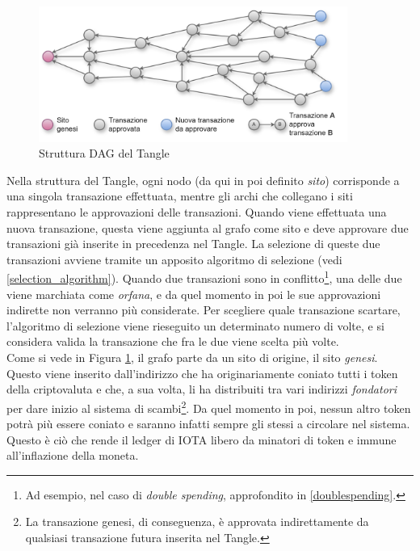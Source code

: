 \documentclass[12pt,a4paper,openright,twoside]{report}
\begin{document}
\begin{figure}[h]
\begin{center}
\includegraphics[width=0.9\textwidth]{figures/my_tangle.png}
\caption[Il Tangle]{Struttura DAG del Tangle}\label{fig:tangle}
\end{center}
\end{figure}
Nella struttura del Tangle, ogni nodo (da qui in poi definito \textit{sito}) corrisponde a una singola transazione effettuata, mentre gli archi che collegano i siti rappresentano le approvazioni delle transazioni. Quando viene effettuata una nuova transazione, questa viene aggiunta al grafo come sito e deve approvare due transazioni già inserite in precedenza nel Tangle. La selezione di queste due transazioni avviene tramite un apposito algoritmo di selezione (vedi \ref{selection_algorithm}). Quando due transazioni sono in conflitto\footnote{Ad esempio, nel caso di \textit{double spending}, approfondito in \ref{doublespending}.}, una delle due viene marchiata come \textit{orfana}, e da quel momento in poi le sue approvazioni indirette non verranno più considerate. Per scegliere quale transazione scartare, l'algoritmo di selezione viene rieseguito un determinato numero di volte, e si considera valida la transazione che fra le due viene scelta più volte.\\
Come si vede in Figura \ref{fig:tangle}, il grafo parte da un sito di origine, il sito \textit{genesi}. Questo viene inserito dall'indirizzo che ha originariamente coniato tutti i token della criptovaluta e che, a sua volta, li ha distribuiti tra vari indirizzi \textit{fondatori} per dare inizio al sistema di scambi\footnote{La transazione genesi, di conseguenza, è approvata indirettamente da qualsiasi transazione futura inserita nel Tangle.}. Da quel momento in poi, nessun altro token potrà più essere coniato e saranno infatti sempre gli stessi a circolare nel sistema. Questo è ciò che rende il ledger di IOTA libero da minatori di token e immune all'inflazione della moneta.
\end{document}
